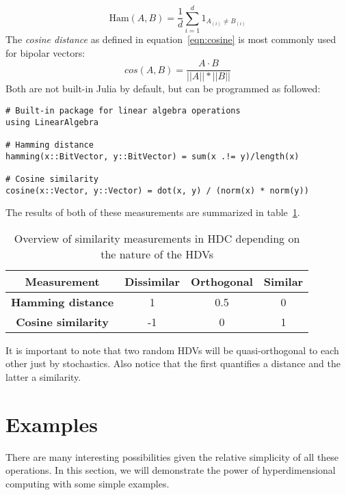 \begin{equation}
    \label{eqn:Hamming}
    \text{Ham}(A, B) = \frac{1}{d} \sum_{i=1}^{d} 1_{A_{(i)} \neq B_{(i)}}
\end{equation}
The \textit{cosine distance} as defined in equation~\ref{eqn:cosine} is most commonly used for bipolar vectors:
\begin{equation}
    \label{eqn:cosine}
    cos(A, B) = \frac{A \cdot B}{||A|| * ||B||}
\end{equation}
Both are not built-in Julia by default, but can be programmed as followed:
\begin{verbatim}
# Built-in package for linear algebra operations 
using LinearAlgebra

# Hamming distance
hamming(x::BitVector, y::BitVector) = sum(x .!= y)/length(x)

# Cosine similarity
cosine(x::Vector, y::Vector) = dot(x, y) / (norm(x) * norm(y))
\end{verbatim}
The results of both of these measurements are summarized in table~\ref{tab:dist}.
\begin{table}[h]
    \centering
    \caption{\label{tab:dist}Overview of similarity measurements in HDC depending on the nature of the HDVs}
    \begin{tabular}{|cccc|}
        \hline
        \textbf{Measurement} & \textbf{Dissimilar} & \textbf{Orthogonal} & \textbf{Similar} \\
        \hline
        \textbf{Hamming distance} & 1 & 0.5 & 0 \\
        \hline
        \textbf{Cosine similarity} & -1 & 0 & 1 \\
        \hline
    \end{tabular} 
\end{table}

It is important to note that two random HDVs will be quasi-orthogonal to each other just by stochastics. Also notice that the first quantifies a distance and the latter a similarity.
\section{Examples}
There are many interesting possibilities given the relative simplicity of all these operations. In this section, we will demonstrate the power of hyperdimensional computing with some simple examples.
